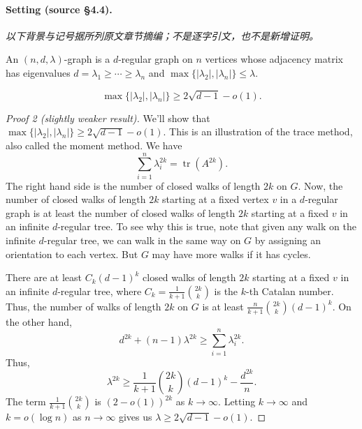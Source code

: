 \paragraph{Setting (source \S4.4).}
\noindent\textit{以下背景与记号据所列原文章节摘编；不是逐字引文，也不是新增证明。}\par An $(n,d,\lambda)$-graph is a $d$-regular graph on $n$ vertices whose adjacency matrix has eigenvalues $d=\lambda_1\geq\cdots\geq\lambda_n$ and $\max\{|\lambda_2|,|\lambda_n|\}\leq\lambda$.
\begin{theorem}
\[\max\{|\lambda_2|,|\lambda_n|\}\geq2\sqrt{d-1}-o(1).\]
\end{theorem}
\begin{proof}[Proof 2 (slightly weaker result)]
We'll show that $\max\{|\lambda_2|,|\lambda_n|\}\geq2\sqrt{d-1}-o(1)$. This is an illustration of the trace method, also called the moment method. We have
\[\sum_{i=1}^n\lambda_i^{2k}=\operatorname{tr}(A^{2k}).\]
The right hand side is the number of closed walks of length $2k$ on $G$. Now, the number of closed walks of length $2k$ starting at a fixed vertex $v$ in a $d$-regular graph is at least the number of closed walks of length $2k$ starting at a fixed $v$ in an infinite $d$-regular tree. To see why this is true, note that given any walk on the infinite $d$-regular tree, we can walk in the same way on $G$ by assigning an orientation to each vertex. But $G$ may have more walks if it has cycles.

There are at least $C_k(d-1)^k$ closed walks of length $2k$ starting at a fixed $v$ in an infinite $d$-regular tree, where $C_k=\frac1{k+1}\binom{2k}{k}$ is the $k$-th Catalan number. Thus, the number of walks of length $2k$ on $G$ is at least $\frac{n}{k+1}\binom{2k}{k}(d-1)^k$. On the other hand,
\[d^{2k}+(n-1)\lambda^{2k}\geq\sum_{i=1}^n\lambda_i^{2k}.\]
Thus,
\[\lambda^{2k}\geq\frac1{k+1}\binom{2k}{k}(d-1)^k-\frac{d^{2k}}{n}.\]
The term $\frac1{k+1}\binom{2k}{k}$ is $(2-o(1))^{2k}$ as $k\to\infty$. Letting $k\to\infty$ and $k=o(\log n)$ as $n\to\infty$ gives us $\lambda\geq2\sqrt{d-1}-o(1)$.
\end{proof}
